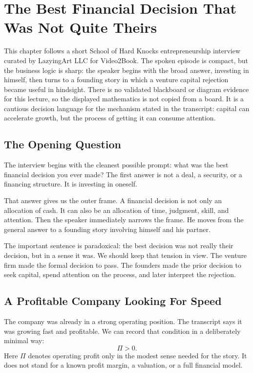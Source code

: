\chapter{The Best Financial Decision That Was Not Quite Theirs}

This chapter follows a short School of Hard Knocks entrepreneurship interview curated by LazyingArt LLC for Video2Book. The spoken episode is compact, but the business logic is sharp: the speaker begins with the broad answer, investing in himself, then turns to a founding story in which a venture capital rejection became useful in hindsight. There is no validated blackboard or diagram evidence for this lecture, so the displayed mathematics is not copied from a board. It is a cautious decision language for the mechanism stated in the transcript: capital can accelerate growth, but the process of getting it can consume attention.

\section{The Opening Question}

The interview begins with the cleanest possible prompt: what was the best financial decision you ever made? The first answer is not a deal, a security, or a financing structure. It is investing in oneself.

That answer gives us the outer frame. A financial decision is not only an allocation of cash. It can also be an allocation of time, judgment, skill, and attention. Then the speaker immediately narrows the frame. He moves from the general answer to a founding story involving himself and his partner.

The important sentence is paradoxical: the best decision was not really their decision, but in a sense it was. We should keep that tension in view. The venture firm made the formal decision to pass. The founders made the prior decision to seek capital, spend attention on the process, and later interpret the rejection.

\section{A Profitable Company Looking For Speed}

The company was already in a strong operating position. The transcript says it was growing fast and profitable. We can record that condition in a deliberately minimal way:
\begin{equation}
\Pi > 0 .
\end{equation}
Here \(\Pi\) denotes operating profit only in the modest sense needed for the story. It does not stand for a known profit margin, a valuation, or a full financial model.

